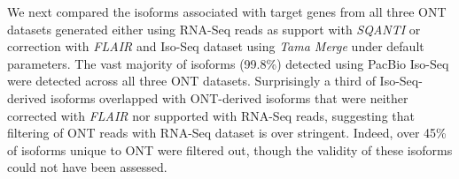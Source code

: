 We next compared the isoforms associated with target genes from all three ONT datasets generated either using RNA-Seq reads as support with \textit{SQANTI} or correction with \textit{FLAIR} and Iso-Seq dataset using \textit{Tama Merge} under default parameters. The vast majority of isoforms (99.8\%) detected using PacBio Iso-Seq were detected across all three ONT datasets. Surprisingly a third of Iso-Seq-derived isoforms overlapped with ONT-derived isoforms that were neither corrected with \textit{FLAIR} nor supported with RNA-Seq reads, suggesting that filtering of ONT reads with RNA-Seq dataset is over stringent. Indeed, over 45\% of isoforms unique to ONT were filtered out, though the validity of these isoforms could not have been assessed. 


